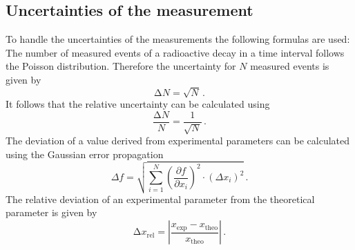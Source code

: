 \subsection{Uncertainties of the measurement}
\label{sec:fehlerrechnung}
To handle the uncertainties of the measurements the following formulas are used:
The number of measured events of a radioactive decay in a time interval follows the Poisson distribution. 
Therefore the uncertainty for $N$ measured events is given by 
\begin{equation}
    \mathrm{\Delta} N = \sqrt{N} \, .
    \label{eqn:poisson_error}
\end{equation}
It follows that the relative uncertainty can be calculated using \cite[11]{leo_1994}
\begin{equation}
    \frac{\mathrm{\Delta}N}{N} = \frac{1}{\sqrt{N}} \, .
    \label{eqn:relative_poisson}
\end{equation}
The deviation of a value derived from experimental parameters can be calculated using the Gaussian error propagation
\begin{equation}
\Delta f = \sqrt{\sum_{i=1}^{N} \left( \frac{\partial f}{\partial x_i} \right)^2 \cdot (\Delta x_i)^2} \, .
\label{eqn:fehlerfortpflanzung}
\end{equation}
The relative deviation of an experimental parameter from the theoretical parameter is given by ~\cite{relabw}
\begin{equation}
    \increment x_{\mathrm{rel}} = \left| \frac{x_{\mathrm{\exp}}-x_{\mathrm{theo}}}{x_{\mathrm{theo}}}\right|\, .
    \label{eqn:relabw}
\end{equation}

